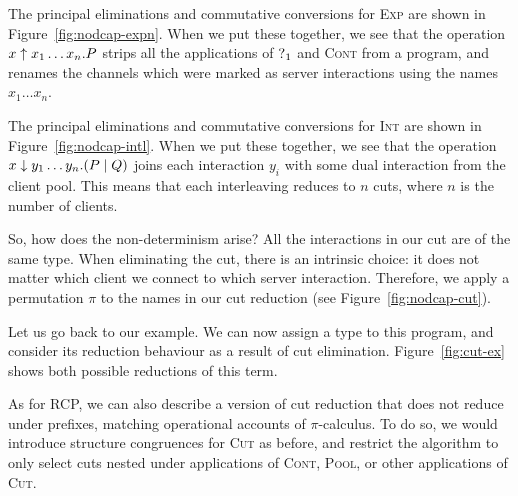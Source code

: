 \documentclass[a4paper,UKenglish]{lipics-v2016}
\begin{document}
The principal eliminations and commutative conversions for \textsc{Exp} are
shown in Figure~\ref{fig:nodcap-expn}. When we put these together, we see that
the operation $\expn{x}{x_1 \dots x_n}P$ strips all the applications of
$\give[1]{}$ and \textsc{Cont} from a program, and renames the channels which
were marked as server interactions using the names $x_1 \dots x_n$.
%

%
The principal eliminations and commutative conversions for \textsc{Int} are
shown in Figure~\ref{fig:nodcap-intl}. When we put these together, we see that
the operation $\intl{x}{y_1 \dots y_n}(P \mid Q)$ joins each interaction $y_i$
with some dual interaction from the client pool. This means that each
interleaving reduces to $n$ cuts, where $n$ is the number of clients.
%


So, how does the non-determinism arise? All the interactions in our cut are
of the same type. When eliminating the cut, there is an intrinsic
choice: it does not matter which client we connect to which server
interaction. Therefore, we apply a permutation $\pi$ to the names in our cut
reduction (see Figure~\ref{fig:nodcap-cut}).

Let us go back to our example. We can now assign a type to this program, and
consider its reduction behaviour as a result of cut elimination.
Figure~\ref{fig:cut-ex} shows both possible reductions of this term.
%


As for RCP, we can also describe a version of cut reduction that does not reduce
under prefixes, matching operational accounts of $\pi$-calculus.  To do so,
we would introduce structure congruences for \textsc{Cut} as before, and
restrict the algorithm to only select cuts nested under applications of
\textsc{Cont}, \textsc{Pool}, or other applications of \textsc{Cut}.
\end{document}

